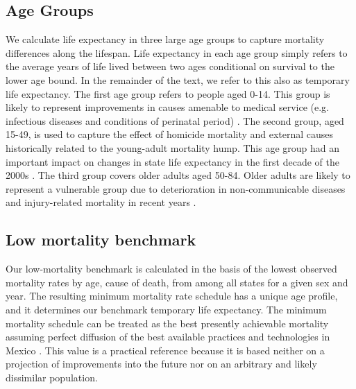 \documentclass{bmcart}
\begin{document}




\subsection*{Age Groups}

We calculate life expectancy in three large age groups to capture mortality differences along the lifespan. Life expectancy in each age group simply refers to the average years of life lived between two ages conditional on survival to the lower age bound. In the remainder of the text, we refer to this also as temporary life expectancy. The first age group refers to people aged 0-14. This group is likely to represent improvements in causes amenable to medical service (e.g. infectious diseases and conditions of perinatal period) \cite{canudas2014}. The second group, aged 15-49, is used to capture the effect of homicide mortality and external causes historically related to the young-adult mortality hump. This age group had an important impact on changes in state life expectancy in the first decade of the 2000s \cite{Aburto2015}. The third group covers older adults aged 50-84. Older adults are likely to represent a vulnerable group due to deterioration in non-communicable diseases and injury-related mortality in recent years \cite{gonzalez2011health,gomez2016dissonant}.

\subsection*{Low mortality benchmark}
Our low-mortality benchmark is calculated in the basis of the lowest observed mortality rates by age, cause of death, from among all states for a given sex and year. The resulting minimum mortality rate schedule has a unique age profile, and it determines our benchmark temporary life expectancy. The minimum mortality schedule can be treated as the best presently achievable mortality assuming perfect diffusion of the best available practices and technologies in Mexico \cite{vallin2008minimum}. This value is a practical reference because it is based neither on a projection of improvements into the future nor on an arbitrary and likely dissimilar population. 
\end{document}
